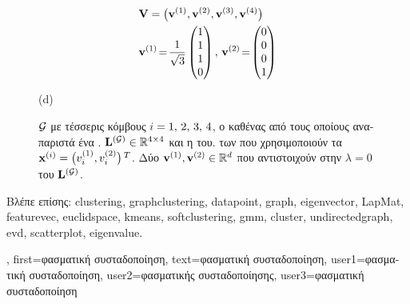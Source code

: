 {{\begin{figure}[H]
\begin{center}
\begin{minipage}{0.4\textwidth}
					\begin{align}
					& \mathbf{V} = \big( {\bf v}^{(1)},{\bf v}^{(2)},{\bf v}^{(3)},{\bf v}^{(4)} \big) \nonumber \\
					&	\mathbf{v}^{(1)}\!=\!\frac{1}{\sqrt{3}} \begin{pmatrix} 1 \\ 1 \\ 1 \\ 0 \end{pmatrix}, \,
					\mathbf{v}^{(2)}\!=\!\begin{pmatrix} 0 \\ 0 \\ 0 \\ 1 \end{pmatrix} \nonumber 
					\end{align}
					\begin{minipage}{\textwidth}
						\vspace{10ex}
						\centering
						{\selectfont (d)}
					\end{minipage}
				\end{minipage} 
		{
		\caption{\label{fig_lap_mtx_specclustering_dict}   $\mathcal{G}$ 
			\foreignlanguage{greek}{με τέσσερις κόμβους $i=1,\,2,\,3,\,4$, ο καθένας από τους οποίους αναπαριστά ένα} 
			.   
			${\bf L}^{(\mathcal{G})} \in \mathbb{R}^{4 \times 4}$ \foreignlanguage{greek}{και η}  
			\foreignlanguage{greek}{του}.   \foreignlanguage{greek}{των} 
			 \foreignlanguage{greek}{που χρησιμοποιούν τα}  
			${\bf x}^{(i)} = \big( v^{(1)}_{i},v^{(2)}_{i} \big)\,^{T}$. 
			 \foreignlanguage{greek}{Δύο}  
			${\bf v}^{(1)},{\bf v}^{(2)} \in \mathbb{R}^{d}$ \foreignlanguage{greek}{που αντιστοιχούν στην} 
			 $\lambda=0$ \foreignlanguage{greek}{του}  ${\bf L}^{(\mathcal{G})}$. } }
			\end{center}
		\end{figure}
		\newpage
		\foreignlanguage{greek}{Βλέπε επίσης:} \gls{clustering}, \gls{graphclustering}, \gls{datapoint}, \gls{graph}, \gls{eigenvector}, \gls{LapMat}, 
		\gls{featurevec}, \gls{euclidspace}, \gls{kmeans}, \gls{softclustering}, \gls{gmm}, \gls{cluster}, \gls{undirectedgraph}, \gls{evd}, 
		\gls{scatterplot}, \gls{eigenvalue}.}, 
	first={\foreignlanguage{greek}{φασματική συσταδοποίηση}},
	text={\foreignlanguage{greek}{φασματική συσταδοποίηση}},
	user1={\foreignlanguage{greek}{φασματική συσταδοποίηση}}, %
    	user2={\foreignlanguage{greek}{φασματικής συσταδοποίησης}}, %
	user3={\foreignlanguage{greek}{φασματική συσταδοποίηση}} %
}

